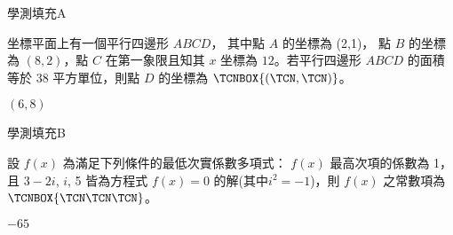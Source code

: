    \begin{QUESTION}
        \begin{ExamInfo}{99}{學測}{填充}{A}
        \end{ExamInfo}
        \begin{ExamAnsRateInfo}{29}{64}{19}{4}
        \end{ExamAnsRateInfo}
        \begin{QBODY}
            坐標平面上有一個平行四邊形 $ABCD$， 其中點 $A$ 的坐標為 (2,1)， 點 $B$ 的坐標為 $(8, 2)$，點 $C$ 在第一象限且知其 $x$ 坐標為 $12$。若平行四邊形 $ABCD$ 的面積等於 38 平方單位，則點 $D$ 的坐標為 $\TCNBOX{(\TCN,\TCN)}$。
        \end{QBODY}
        \begin{QFROMS}
        \end{QFROMS}
        \begin{QTAGS}\end{QTAGS}
        \begin{QANS}
            $(6,8)$
        \end{QANS}
        \begin{QSOLLIST}
        \end{QSOLLIST}
        \begin{QEMPTYSPACE}
        \end{QEMPTYSPACE}
    \end{QUESTION}
    \begin{QUESTION}
        \begin{ExamInfo}{99}{學測}{填充}{B}
        \end{ExamInfo}
        \begin{ExamAnsRateInfo}{29}{71}{15}{1}
        \end{ExamAnsRateInfo}
        \begin{QBODY}
            設 $f(x)$ 為滿足下列條件的最低次實係數多項式： $f(x)$ 最高次項的係數為 1，且 $3 - 2i$, $i$, 5 皆為方程式 $f(x)=0$ 的解(其中$i^2 =-1$)，則 $f(x)$ 之常數項為	$\TCNBOX{\TCN\TCN\TCN}$。
        \end{QBODY}
        \begin{QFROMS}
        \end{QFROMS}
        \begin{QTAGS}\end{QTAGS}
        \begin{QANS}
            $-65$
        \end{QANS}
        \begin{QSOLLIST}
        \end{QSOLLIST}
        \begin{QEMPTYSPACE}
        \end{QEMPTYSPACE}
    \end{QUESTION}
